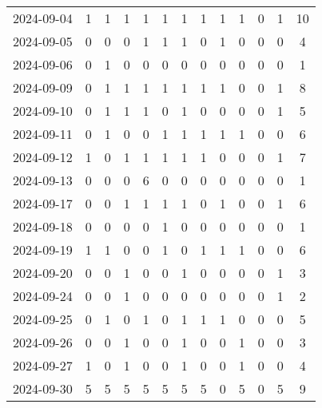 \documentclass[dvipdfmx,oneside]{article}
\begin{document}
\begin{longtable}{lcccccccccccc}
        2024-09-04 &     1 &     1 &     1 &     1 &     1 &     1 &     1 &     1 &     1 &     0 &     1 &     10 \\
        2024-09-05 &     0 &     0 &     0 &     1 &     1 &     1 &     0 &     1 &     0 &     0 &     0 &      4 \\
        2024-09-06 &     0 &     1 &     0 &     0 &     0 &     0 &     0 &     0 &     0 &     0 &     0 &      1 \\
        2024-09-09 &     0 &     1 &     1 &     1 &     1 &     1 &     1 &     1 &     0 &     0 &     1 &      8 \\
        2024-09-10 &     0 &     1 &     1 &     1 &     0 &     1 &     0 &     0 &     0 &     0 &     1 &      5 \\
        2024-09-11 &     0 &     1 &     0 &     0 &     1 &     1 &     1 &     1 &     1 &     0 &     0 &      6 \\
        2024-09-12 &     1 &     0 &     1 &     1 &     1 &     1 &     1 &     0 &     0 &     0 &     1 &      7 \\
        2024-09-13 &     0 &     0 &     0 &     6 &     0 &     0 &     0 &     0 &     0 &     0 &     0 &      1 \\
        2024-09-17 &     0 &     0 &     1 &     1 &     1 &     1 &     0 &     1 &     0 &     0 &     1 &      6 \\
        2024-09-18 &     0 &     0 &     0 &     0 &     1 &     0 &     0 &     0 &     0 &     0 &     0 &      1 \\
        2024-09-19 &     1 &     1 &     0 &     0 &     1 &     0 &     1 &     1 &     1 &     0 &     0 &      6 \\
        2024-09-20 &     0 &     0 &     1 &     0 &     0 &     1 &     0 &     0 &     0 &     0 &     1 &      3 \\
        2024-09-24 &     0 &     0 &     1 &     0 &     0 &     0 &     0 &     0 &     0 &     0 &     1 &      2 \\
        2024-09-25 &     0 &     1 &     0 &     1 &     0 &     1 &     1 &     1 &     0 &     0 &     0 &      5 \\
        2024-09-26 &     0 &     0 &     1 &     0 &     0 &     1 &     0 &     0 &     1 &     0 &     0 &      3 \\
        2024-09-27 &     1 &     0 &     1 &     0 &     0 &     1 &     0 &     0 &     1 &     0 &     0 &      4 \\
        2024-09-30 &     5 &     5 &     5 &     5 &     5 &     5 &     5 &     0 &     5 &     0 &     5 &      9 \\

\end{longtable}
\end{document}
